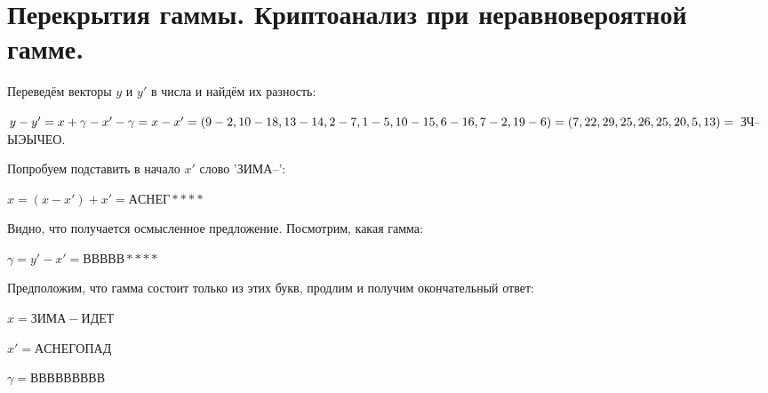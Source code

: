 \section{Перекрытия гаммы. Криптоанализ при неравновероятной гамме.}


Переведём векторы $y$ и $y'$ в числа и найдём их разность:

\noindent $y - y' = x + \gamma - x' - \gamma = x - x' = (9 - 2, 10 - 18, 13 - 14, 2 - 7, 1 - 5, 10 - 15, \\ 6 - 16, 7 - 2, 19 - 6) = (7, 22, 29, 25, 26, 25, 20, 5, 13) = $ ЗЧ--ЫЭЫЧЕО.

Попробуем подставить в начало $x'$ слово 'ЗИМА--':

\noindent $x = (x - x') + x' = АСНЕГ * * * *$

Видно, что получается осмысленное предложение. Посмотрим, какая гамма:

$\gamma = y' - x' = ВВВВВ ****$

Предположим, что гамма состоит только из этих букв, продлим и получим окончательный ответ:

\noindent $x = ЗИМА-ИДЕТ$

\noindent $x' = АСНЕГОПАД$

\noindent $\gamma = ВВВВВВВВВ$

